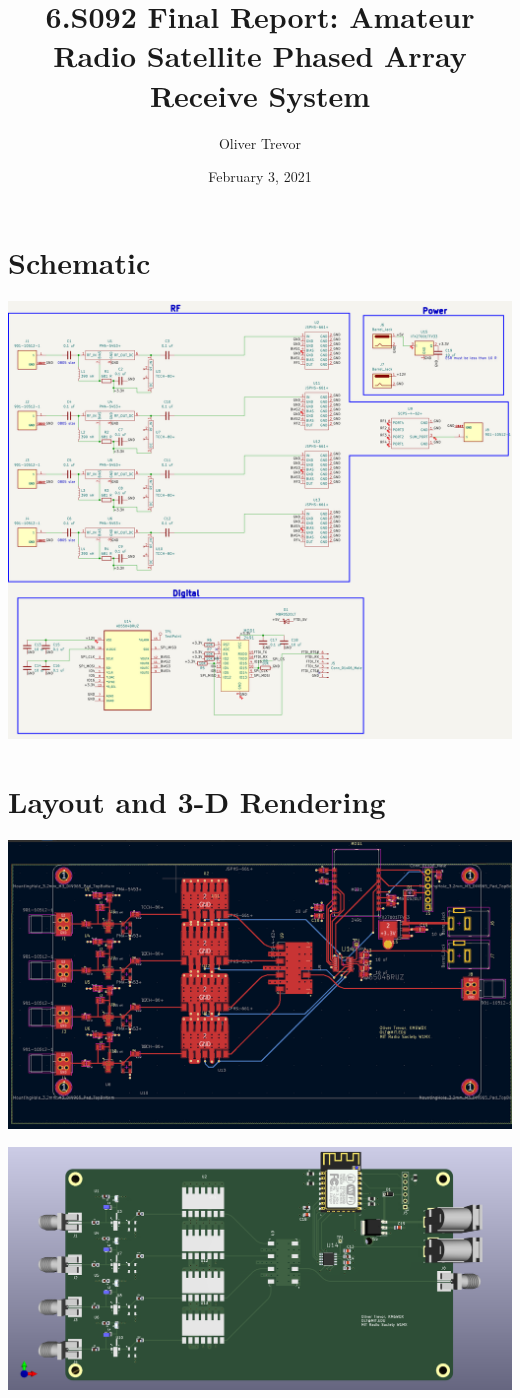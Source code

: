 \documentclass[fleqn]{article}
\begin{document}
\title{6.S092 Final Report: Amateur Radio Satellite Phased Array Receive System}
\author{Oliver Trevor}
\date{February 3, 2021}
\maketitle

\section{Schematic}
\centerline{\includegraphics[width=8.25in]{schematic.png}}

\section{Layout and 3-D Rendering}
\centerline{\includegraphics[width=8.25in]{layout.png}}
\centerline{\includegraphics[width=8.25in]{3drender.png}}
\end{document}
